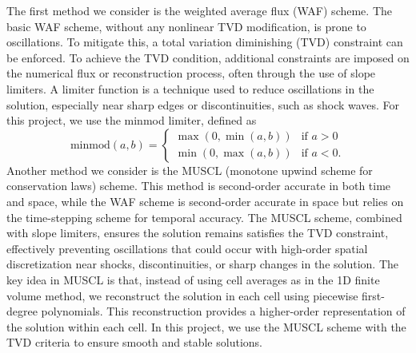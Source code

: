 The first method we consider is the weighted average flux (WAF) scheme.
The basic WAF scheme, without any nonlinear TVD modification, is prone to oscillations.
To mitigate this, a total variation diminishing (TVD) constraint can be enforced.
To achieve the TVD condition, additional constraints are imposed on the numerical flux or reconstruction process, often through the use of slope limiters.
A limiter function is a technique used to reduce oscillations in the solution, especially near sharp edges or discontinuities, such as shock waves.
For this project, we use the minmod limiter, defined as
\begin{equation*}
    \text{minmod}(a,b) = 
    \begin{cases}
        \max(0, \min(a,b)) & \text{if } a > 0 \\
        \min(0, \max(a,b)) & \text{if } a < 0. 
    \end{cases}
\end{equation*}
Another method we consider is the MUSCL (monotone upwind scheme for conservation laws) scheme.
This method is second-order accurate in both time and space, while the WAF scheme is second-order accurate in space but relies on the time-stepping scheme for temporal accuracy.
The MUSCL scheme, combined with slope limiters, ensures the solution remains satisfies the TVD constraint, effectively preventing oscillations that could occur with high-order spatial discretization near shocks, discontinuities, or sharp changes in the solution.
The key idea in MUSCL is that, instead of using cell averages as in the 1D finite volume method, we reconstruct the solution  in each cell using piecewise first-degree polynomials.
This reconstruction provides a higher-order representation of the solution within each cell.
In this project, we use the MUSCL scheme with the TVD criteria to ensure smooth and stable solutions.


